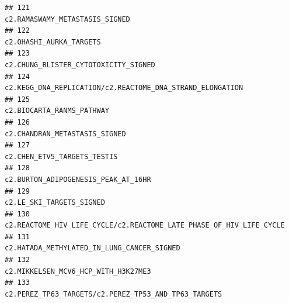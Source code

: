 \documentclass{article}\usepackage[]{graphicx}\usepackage[]{color}
\makeatletter
\newenvironment{kframe}{%
 \def\at@end@of@kframe{}%
 \ifinner\ifhmode%
  \def\at@end@of@kframe{\end{minipage}}%
  \begin{minipage}{\columnwidth}%
 \fi\fi%
 \def\FrameCommand##1{\hskip\@totalleftmargin \hskip-\fboxsep
 \colorbox{shadecolor}{##1}\hskip-\fboxsep
     \hskip-\linewidth \hskip-\@totalleftmargin \hskip\columnwidth}%
 \MakeFramed {\advance\hsize-\width
   \@totalleftmargin\z@ \linewidth\hsize
   \@setminipage}}%
 {\par\unskip\endMakeFramed%
 \at@end@of@kframe}
\newenvironment{knitrout}{}{} %
\makeatother
\begin{document}
\begin{knitrout}
\begin{kframe}
\begin{verbatim}
## 121                                                                                                                                                                                   c2.RAMASWAMY_METASTASIS_SIGNED
## 122                                                                                                                                                                                          c2.OHASHI_AURKA_TARGETS
## 123                                                                                                                                                                             c2.CHUNG_BLISTER_CYTOTOXICITY_SIGNED
## 124                                                                                                                                                        c2.KEGG_DNA_REPLICATION/c2.REACTOME_DNA_STRAND_ELONGATION
## 125                                                                                                                                                                                        c2.BIOCARTA_RANMS_PATHWAY
## 126                                                                                                                                                                                    c2.CHANDRAN_METASTASIS_SIGNED
## 127                                                                                                                                                                                      c2.CHEN_ETV5_TARGETS_TESTIS
## 128                                                                                                                                                                              c2.BURTON_ADIPOGENESIS_PEAK_AT_16HR
## 129                                                                                                                                                                                         c2.LE_SKI_TARGETS_SIGNED
## 130                                                                                                                                              c2.REACTOME_HIV_LIFE_CYCLE/c2.REACTOME_LATE_PHASE_OF_HIV_LIFE_CYCLE
## 131                                                                                                                                                                       c2.HATADA_METHYLATED_IN_LUNG_CANCER_SIGNED
## 132                                                                                                                                                                              c2.MIKKELSEN_MCV6_HCP_WITH_H3K27ME3
## 133                                                                                                                                                             c2.PEREZ_TP63_TARGETS/c2.PEREZ_TP53_AND_TP63_TARGETS

\end{verbatim}
\end{kframe}
\end{knitrout}
\end{document}

